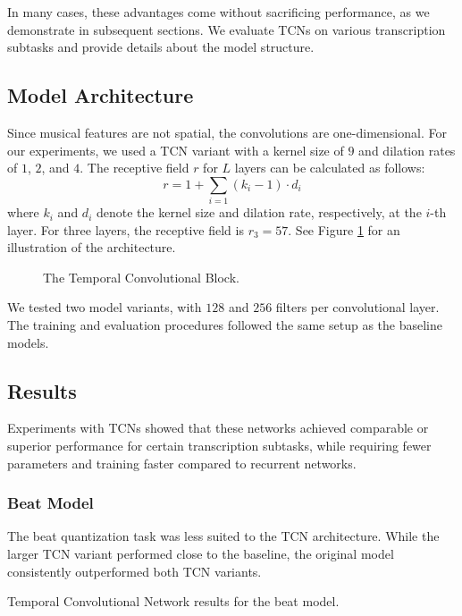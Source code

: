 In many cases, these advantages come without sacrificing performance, as we demonstrate in subsequent sections. We evaluate TCNs on various transcription subtasks and provide details about the model structure.

\subsection{Model Architecture}

Since musical features are not spatial, the convolutions are one-dimensional. For our experiments, we used a TCN variant with a kernel size of $9$ and dilation rates of $1$, $2$, and $4$. The receptive field $r$ for $L$ layers can be calculated as follows: \[r = 1 + \sum_{i=1}\left(k_i - 1\right)\cdot d_i\] where $k_i$ and $d_i$ denote the kernel size and dilation rate, respectively, at the $i$-th layer. For three layers, the receptive field is $r_3 = 57$. See Figure \ref{temporal_convolutional_network} for an illustration of the architecture.

\begin{figure}[ht!]
\centering

\caption[The Temporal Convolutional Block.]{The Temporal Convolutional Block.}
\label{temporal_convolutional_network}
\end{figure}

We tested two model variants, with $128$ and $256$ filters per convolutional layer. The training and evaluation procedures followed the same setup as the baseline models.

\subsection{Results}

Experiments with TCNs showed that these networks achieved comparable or superior performance for certain transcription subtasks, while requiring fewer parameters and training faster compared to recurrent networks.

\subsubsection{Beat Model}

The beat quantization task was less suited to the TCN architecture. While the larger TCN variant performed close to the baseline, the original model consistently outperformed both TCN variants.

\begin{table}[ht!]
\centering

\caption[Temporal Convolutional Network results for the beat model.]{Temporal Convolutional Network results for the beat model.}
\label{beat_tcn}
\end{table}

